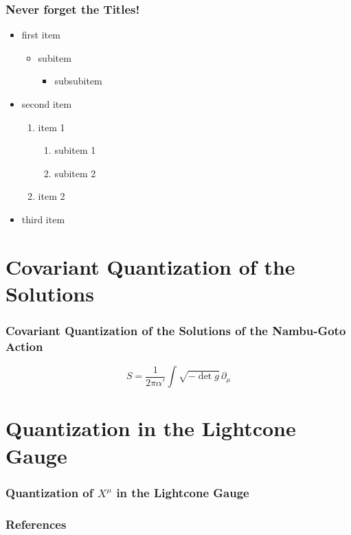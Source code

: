 \documentclass[aspectratio=169]{beamer}
\begin{document}
	\begin{frame}
		\frametitle{Never forget the Titles!}
		\begin{itemize}
			\item<1,2,3,4,5> first item 
			\begin{itemize}
				\item<2,3,4,5> subitem
				\begin{itemize}
					\item<3,4,5> subsubitem
				\end{itemize}
			\end{itemize}
			\item<4,5>second item
			\begin{enumerate}
				\item item 1
				\begin{enumerate}
					\item subitem 1
					\item subitem 2
				\end{enumerate}
				\item item 2
			\end{enumerate}
			\item<5>third item
		\end{itemize}	
	\end{frame}

	\section{Covariant Quantization of the Solutions}
	
	\begin{frame}
		\frametitle{Covariant Quantization of the Solutions of the Nambu-Goto Action}
		
		\begin{equation*}
			S = \frac{1}{2\pi\alpha'}\int\sqrt{-\det g} \, \partial_\mu
		\end{equation*}
	
	\end{frame}	

	\section{Quantization in the Lightcone Gauge}
	
	\begin{frame}
		\frametitle{Quantization of $X^\mu$ in the Lightcone Gauge}
	\end{frame}

	\begin{frame}
		\frametitle{References}
		\printbibliography
	\end{frame}
\end{document}
